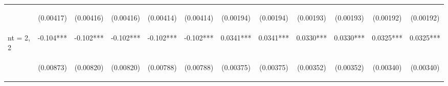 \documentclass[]{article}
\begin{document}
\begin{center}
\begin{tabular}{lccccccccccc}
\vspace{4pt} & \begin{footnotesize}(0.00417)\end{footnotesize} & \begin{footnotesize}(0.00416)\end{footnotesize} & \begin{footnotesize}(0.00416)\end{footnotesize} & \begin{footnotesize}(0.00414)\end{footnotesize} & \begin{footnotesize}(0.00414)\end{footnotesize} & \begin{footnotesize}(0.00194)\end{footnotesize} & \begin{footnotesize}(0.00194)\end{footnotesize} & \begin{footnotesize}(0.00193)\end{footnotesize} & \begin{footnotesize}(0.00193)\end{footnotesize} & \begin{footnotesize}(0.00192)\end{footnotesize} & \begin{footnotesize}(0.00192)\end{footnotesize} \\
nt = 2, 2 & -0.104*** & -0.102*** & -0.102*** & -0.102*** & -0.102*** & 0.0341*** & 0.0341*** & 0.0330*** & 0.0330*** & 0.0325*** & 0.0325*** \\
\vspace{4pt} & \begin{footnotesize}(0.00873)\end{footnotesize} & \begin{footnotesize}(0.00820)\end{footnotesize} & \begin{footnotesize}(0.00820)\end{footnotesize} & \begin{footnotesize}(0.00788)\end{footnotesize} & \begin{footnotesize}(0.00788)\end{footnotesize} & \begin{footnotesize}(0.00375)\end{footnotesize} & \begin{footnotesize}(0.00375)\end{footnotesize} & \begin{footnotesize}(0.00352)\end{footnotesize} & \begin{footnotesize}(0.00352)\end{footnotesize} & \begin{footnotesize}(0.00340)\end{footnotesize} & \begin{footnotesize}(0.00340)\end{footnotesize} \\

\end{tabular}
\end{center}
\end{document}
